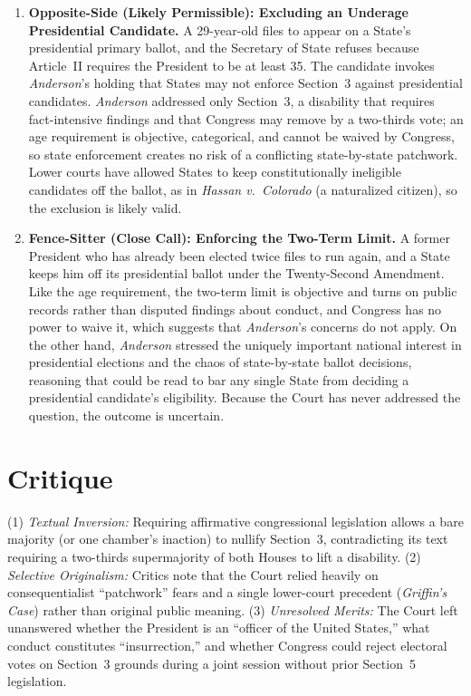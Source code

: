 \documentclass[12pt]{article}
\begin{document}
\begin{enumerate}
\item \textbf{Opposite-Side (Likely Permissible): Excluding an Underage Presidential Candidate.} A 29-year-old files to appear on a State's presidential primary ballot, and the Secretary of State refuses because Article~II requires the President to be at least 35. The candidate invokes \textit{Anderson}'s holding that States may not enforce Section~3 against presidential candidates. \textit{Anderson} addressed only Section~3, a disability that requires fact-intensive findings and that Congress may remove by a two-thirds vote; an age requirement is objective, categorical, and cannot be waived by Congress, so state enforcement creates no risk of a conflicting state-by-state patchwork. Lower courts have allowed States to keep constitutionally ineligible candidates off the ballot, as in \textit{Hassan v.\ Colorado} (a naturalized citizen), so the exclusion is likely valid.

\item \textbf{Fence-Sitter (Close Call): Enforcing the Two-Term Limit.} A former President who has already been elected twice files to run again, and a State keeps him off its presidential ballot under the Twenty-Second Amendment. Like the age requirement, the two-term limit is objective and turns on public records rather than disputed findings about conduct, and Congress has no power to waive it, which suggests that \textit{Anderson}'s concerns do not apply. On the other hand, \textit{Anderson} stressed the uniquely important national interest in presidential elections and the chaos of state-by-state ballot decisions, reasoning that could be read to bar any single State from deciding a presidential candidate's eligibility. Because the Court has never addressed the question, the outcome is uncertain.

\end{enumerate}

\section{Critique}
(1) \emph{Textual Inversion:} Requiring affirmative congressional legislation allows a bare majority (or one chamber's inaction) to nullify Section~3, contradicting its text requiring a two-thirds supermajority of both Houses to lift a disability. (2) \emph{Selective Originalism:} Critics note that the Court relied heavily on consequentialist ``patchwork'' fears and a single lower-court precedent (\emph{Griffin's Case}) rather than original public meaning. (3) \emph{Unresolved Merits:} The Court left unanswered whether the President is an ``officer of the United States,'' what conduct constitutes ``insurrection,'' and whether Congress could reject electoral votes on Section~3 grounds during a joint session without prior Section~5 legislation.
\end{document}
